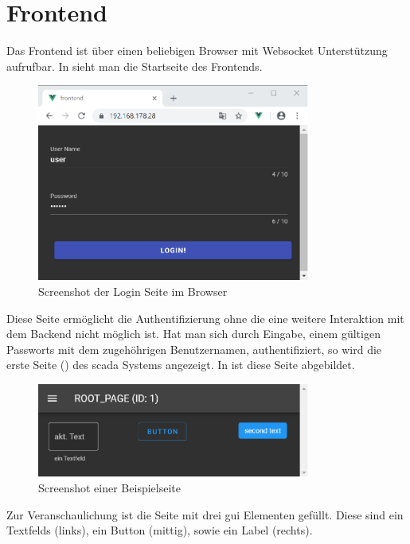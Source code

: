 \section{Frontend}\label{sec:poc:frontend}
Das Frontend ist über einen beliebigen Browser mit Websocket Unterstützung aufrufbar.
In  sieht man die Startseite des Frontends.
\begin{figure}[H]
  \centering
  \includegraphics[width=0.8\textwidth]{content/hauptteil/umsetzungPoC/frontend/res/login.pdf}
  \caption{Screenshot der Login Seite im Browser}
  \label{fig:frontend:poc:login}
\end{figure}
Diese Seite ermöglicht die Authentifizierung ohne die eine weitere Interaktion mit dem Backend nicht möglich ist.
Hat man sich durch Eingabe, einem gültigen Passworts mit dem zugehöhrigen Benutzernamen, authentifiziert, 
so wird die erste Seite () des \ac{scada} Systems angezeigt. In  ist diese Seite abgebildet.
\begin{figure}[ht]
  \centering
  \includegraphics[width=0.8\textwidth]{content/hauptteil/umsetzungPoC/frontend/res/page.pdf}
  \caption{Screenshot einer Beispielseite}
  \label{fig:frontend:poc:page}
\end{figure}
Zur Veranschaulichung ist die Seite mit drei \ac{gui} Elementen gefüllt. 
Diese sind ein Textfelds (links), ein Button (mittig), sowie ein Label (rechts).
